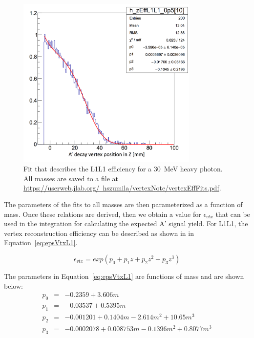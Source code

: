 \documentclass[twoside]{article}
\begin{document}
\begin{figure}[H]
  \centering
      \includegraphics[width=0.8\textwidth]{plots/L1L1_eff_35MeV.png}
  \caption{Fit that describes the L1L1 efficiency for a 30~MeV heavy photon. All masses are saved to a file at\\
  \href{url}{https://userweb.jlab.org/~hszumila/vertexNote/vertexEffFits.pdf}.}
  \label{fig:effFitted}
\end{figure} 

The parameters of the fits to all masses are then parameterized as a function of mass. Once these relations are derived, then we obtain a value for $\epsilon_{vtx}$ that can be used in the integration for calculating the expected A' signal yield. For L1L1, the vertex reconstruction efficiency can be described as shown in in Equation~\eqref{eq:epsVtxL1}.

\begin{equation}
\label{eq:epsVtxL1}
\epsilon_{vtx} = exp(p_0+p_1z+p_2z^2+p_3z^3) 
\end{equation}

The parameters in Equation~\eqref{eq:epsVtxL1} are functions of mass and are shown below:
\begin{eqnarray*}
\label{eq:parsEpsVtxL1}
p_0 & = & -0.2359+3.606m\\
p_1 & = & -0.03537+0.5395m \\
p_2 & = & -0.001201+0.1404m-2.614m^2+10.65m^3 \\
p_3 & = & -0.0002078+0.008753m-0.1396m^2+0.8077m^3\\
\end{eqnarray*}
\end{document}

